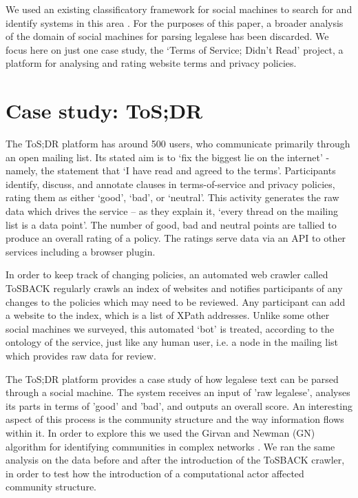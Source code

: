 \documentclass{sig-alternate}
\begin{document}
We used an existing classificatory framework for social machines to search for and identify systems in this area \cite{shadbolt:classif}. For the purposes of this paper, a broader analysis of the domain of social machines for parsing legalese has been discarded. We focus here on just one case study, the `Terms of Service; Didn't Read' project, a platform for analysing and rating website terms and privacy policies.

\section{Case study: ToS;DR}

The ToS;DR platform has around 500 users, who communicate primarily through an open mailing list. Its stated aim is to `fix the biggest lie on the internet' - namely, the statement that `I have read and agreed to the terms'. Participants identify, discuss, and annotate clauses in terms-of-service and privacy policies, rating them as either `good', `bad', or `neutral'. This activity generates the raw data which drives the service – as they explain it, `every thread on the mailing list is a data point'. The number of good, bad and neutral points are tallied to produce an overall rating of a policy. The ratings serve data via an API to other services including a browser plugin.

In order to keep track of changing policies, an automated web crawler called ToSBACK regularly crawls an index of websites and notifies participants of any changes to the policies which may need to be reviewed. Any participant can add a website to the index, which is a list of XPath addresses. Unlike some other social machines we surveyed, this automated `bot' is treated, according to the ontology of the service, just like any human user, i.e. a node in the mailing list which provides raw data for review.

The ToS;DR platform provides a case study of how legalese text can be parsed through a social machine. The system receives an input of 'raw legalese', analyses its parts in terms of 'good' and 'bad', and outputs an overall score. An interesting aspect of this process is the community structure and the way information flows within it. In order to explore this we used the Girvan and Newman (GN) algorithm for identifying communities in complex networks \cite{gnm:comm}. We ran the same analysis on the data before and after the introduction of the ToSBACK crawler, in order to test how the introduction of a computational actor affected community structure.
\end{document}
